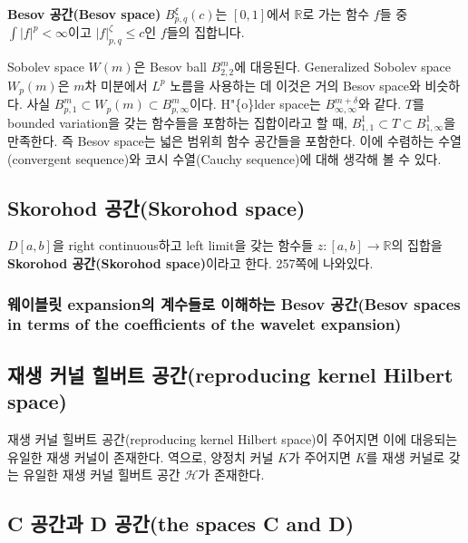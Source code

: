 \documentclass[b5paper,]{scrbook}
\theoremstyle{plain}
\theoremstyle{definition}
\numberwithin{equation}{section}
\let\BeginKnitrBlock\begin \let\EndKnitrBlock\end
\begin{document}
\BeginKnitrBlock{definition}[Besov 공간]
\protect\hypertarget{def:unnamed-chunk-25}{}{\label{def:unnamed-chunk-25}
{} }\textbf{Besov 공간(Besov space)}
\(B_{p,q}^{\xi}(c)\)는 \([0,1]\)에서 \(\mathbb{R}\)로 가는 함수 \(f\)들
중 \(\int |f|^{p}<\infty\)이고 \(|f|_{p,q}^{\zeta}\leq c\)인 \(f\)들의
집합니다.
\EndKnitrBlock{definition}

Sobolev space \(W(m)\)은 Besov ball \(B_{2,2}^{m}\)에 대응된다.
Generalized Sobolev space \(W_{p}(m)\)은 \(m\)차 미분에서 \(L^{p}\)
노름을 사용하는 데 이것은 거의 Besov space와 비슷하다. 사실
\(B_{p,1}^{m} \subset W_{p}(m) \subset B_{p,\infty}^{m}\)이다.
H"\{o\}lder space는 \(B_{\infty,\infty}^{m+\delta}\)와 같다. \(T\)를
bounded variation을 갖는 함수들을 포함하는 집합이라고 할 때,
\(B_{1,1}^{1}\subset T \subset B_{1,\infty}^{1}\)을 만족한다. 즉 Besov
space는 넓은 범위희 함수 공간들을 포함한다. 이에 수렴하는
수열(convergent sequence)와 코시 수열(Cauchy sequence)에 대해 생각해 볼
수 있다.

\subsection{Skorohod 공간(Skorohod
space)}\label{skorohod-skorohod-space}

\(D[a,b]\)을 right continuous하고 left limit을 갖는 함수들
\(z:[a,b]\rightarrow \mathbb{R}\)의 집합을 \textbf{Skorohod
공간(Skorohod space)}이라고 한다. \citep{VanderVaart2000} 257쪽에
나와있다.

\subsubsection{웨이블릿 expansion의 계수들로 이해하는 Besov 공간(Besov
spaces in terms of the coefficients of the wavelet
expansion)}\label{-expansion---besov-besov-spaces-in-terms-of-the-coefficients-of-the-wavelet-expansion}

\subsection{재생 커널 힐버트 공간(reproducing kernel Hilbert
space)}\label{---reproducing-kernel-hilbert-space}

재생 커널 힐버트 공간(reproducing kernel Hilbert space)이 주어지면 이에
대응되는 유일한 재생 커널이 존재한다. 역으로, 양정치 커널 \(K\)가
주어지면 \(K\)를 재생 커널로 갖는 유일한 재생 커널 힐버트 공간
\(\mathcal{H}\)가 존재한다.

\subsection{C 공간과 D 공간(the spaces C and
D)}\label{c--d-the-spaces-c-and-d}
\end{document}
